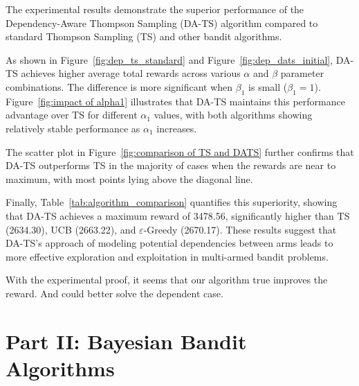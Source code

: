 \documentclass[11pt]{article}
\begin{document}
The experimental results demonstrate the superior performance of the Dependency-Aware Thompson Sampling (DA-TS) algorithm compared to standard Thompson Sampling (TS) and other bandit algorithms. 

As shown in Figure~\ref{fig:dep_ts_standard} and Figure~\ref{fig:dep_dats_initial}, DA-TS achieves higher average total rewards across various \(\alpha\) and \(\beta\) parameter combinations. The difference is more significant when $\beta_1$ is small ($\beta_1 = 1$). Figure~\ref{fig:impact of alpha1} illustrates that DA-TS maintains this performance advantage over TS for different \(\alpha_1\) values, with both algorithms showing relatively stable performance as \(\alpha_1\) increases. 

The scatter plot in Figure~\ref{fig:comparison of TS and DATS} further confirms that DA-TS outperforms TS in the majority of cases when the rewards are near to maximum, with most points lying above the diagonal line. 

Finally, Table~\ref{tab:algorithm_comparison} quantifies this superiority, showing that DA-TS achieves a maximum reward of 3478.56, significantly higher than TS (2634.30), UCB (2663.22), and \(\varepsilon\)-Greedy (2670.17). These results suggest that DA-TS's approach of modeling potential dependencies between arms leads to more effective exploration and exploitation in multi-armed bandit problems.

With the experimental proof, it seems that our algorithm true improves the reward. And could better solve the dependent case.

\newpage
\section{Part II: Bayesian Bandit Algorithms}



\appendix
\end{document}

